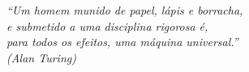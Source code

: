 \begin{epigrafe}
    \vspace*{\fill}
	\begin{flushright}

		\textit{``Um homem munido de papel, lápis e borracha, \\
		e submetido a uma disciplina rigorosa é, \\
		para todos os efeitos, uma máquina universal.'' \\
		(Alan Turing)}
	\end{flushright}
\end{epigrafe}
